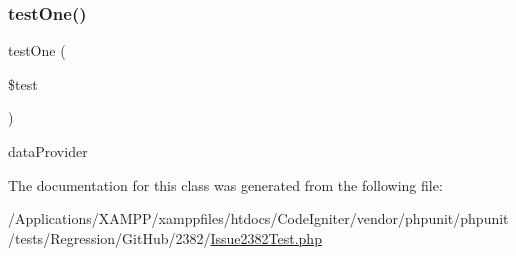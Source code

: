 \mbox{\label{class_issue2382_test_ae1b63de806858f5a0ef98ac08d0d92ef}} 
\subsubsection{\texorpdfstring{test\+One()}{testOne()}}
{\footnotesize\ttfamily test\+One (\begin{DoxyParamCaption}\item[{}]{\$test }\end{DoxyParamCaption})}

data\+Provider 

The documentation for this class was generated from the following file\+:\begin{DoxyCompactItemize}
\item 
/\+Applications/\+X\+A\+M\+P\+P/xamppfiles/htdocs/\+Code\+Igniter/vendor/phpunit/phpunit/tests/\+Regression/\+Git\+Hub/2382/\mbox{\hyperlink{_issue2382_test_8php}{Issue2382\+Test.\+php}}\end{DoxyCompactItemize}

